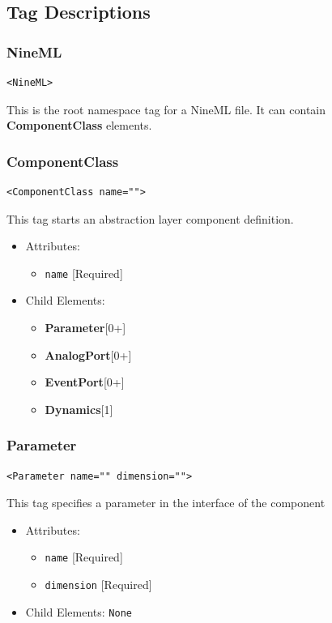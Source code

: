 \documentclass{article}
\newcommand{\ComponentClass}{{\bf{ComponentClass}}\xspace}
\newcommand{\Dynamics}{{\bf{Dynamics}}\xspace}
\newcommand{\AnalogPort}{{\bf{AnalogPort}}\xspace}
\newcommand{\EventPort}{{\bf{EventPort}}\xspace}
\newcommand{\Parameter}{{\bf{Parameter}}\xspace}
\begin{document}
\subsection{Tag Descriptions}

\subsubsection{NineML}
%
\begin{lstlisting}
<NineML>
\end{lstlisting}

This is the root namespace tag for a NineML file. It can contain
\ComponentClass elements.

\subsubsection{ComponentClass}
%
\begin{lstlisting}
<ComponentClass name="">
\end{lstlisting}

This tag starts an abstraction layer component definition.

\begin{itemize}
\item Attributes:
%
\begin{itemize}
\item \verb|name| {[}Required{]}
\end{itemize}

\item Child Elements:
%
\begin{itemize}
\item \Parameter {[}0+{]}
\item \AnalogPort{[}0+{]}
\item \EventPort {[}0+{]}
\item \Dynamics  {[}1{]}
\end{itemize}

\end{itemize}

\subsubsection{Parameter}
%
\begin{lstlisting}
<Parameter name="" dimension="">
\end{lstlisting}

This tag specifies a parameter in the interface of the component

\begin{itemize}
\item Attributes:
%
\begin{itemize}
\item \verb|name| {[}Required{]}
\item \verb|dimension| {[}Required{]}
\end{itemize}

\item Child Elements: \texttt{None}
\end{itemize}
\end{document}
